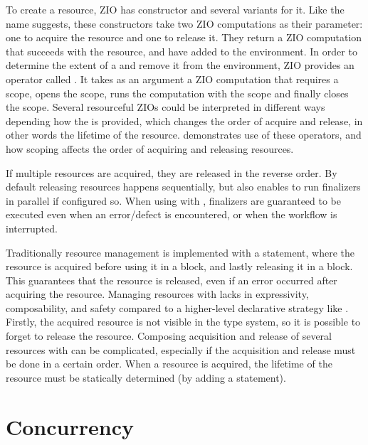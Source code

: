 To create a resource, ZIO has  constructor and several variants for it. Like the name suggests, these constructors take two ZIO computations as their parameter: one to acquire the resource and one to release it. They return a ZIO computation that succeeds with the resource, and have added  to the environment. In order to determine the extent of a  and remove it from the environment, ZIO provides an operator called . It takes as an argument a ZIO computation that requires a scope, opens the scope, runs the computation with the scope and finally closes the scope. Several resourceful ZIOs could be interpreted in different ways depending how the  is provided, which changes the order of acquire and release, in other words the lifetime of the resource.  demonstrates use of these operators, and how scoping affects the order of acquiring and releasing resources.



If multiple resources are acquired, they are released in the reverse order. By default releasing resources happens sequentially, but  also enables to run finalizers in parallel if configured so. When using  with , finalizers are guaranteed to be executed even when an error/defect is encountered, or when the workflow is interrupted.

Traditionally resource management is implemented with a  statement, where the resource is acquired before using it in a  block, and lastly releasing it in a  block. This guarantees that the resource is released, even if an error occurred after acquiring the resource. Managing resources with  lacks in expressivity, composability, and safety compared to a higher-level declarative strategy like . Firstly, the acquired resource is not visible in the type system, so it is possible to forget to release the resource. Composing acquisition and release of several resources with  can be complicated, especially if the acquisition and release must be done in a certain order. When a resource is acquired, the lifetime of the resource must be statically determined (by adding a  statement).



\section{Concurrency}

